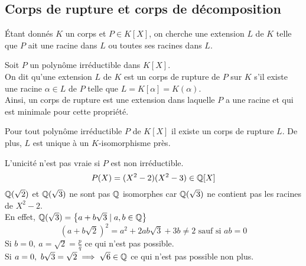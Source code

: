 \subsection{Corps de rupture et corps de décomposition}

Étant donnés $K$ un corps et $P\in K[X]$, on cherche une extension $L$ de $K$ telle que $P$ ait une racine dans $L$ ou toutes ses racines dans $L$.



\begin{definition}
	Soit $P$ un polynôme irréductible dans $K[X]$.\\
	On dit qu'une extension $L$ de $K$ est un corps de rupture de $P$ sur $K$ s'il existe une
	racine $\alpha \in L$ de $P$ telle que $L = K[\alpha] = K(\alpha)$. \\
	Ainsi, un corps de rupture est une extension dans laquelle $P$ a une racine et
	qui est minimale pour cette propriété.
\end{definition}

\begin{theorem}
	Pour tout polynôme irréductible $P$ de $K[X]$ il existe un corps de rupture $L$.
	De plus, $L$ est unique à un $K$-isomorphisme près.
\end{theorem}


\begin{remarque}
	L'unicité n'est pas vraie si $P$ est non irréductible.
	$$ P(X) = (X^2 - 2) (X^2 - 3) \in \mathbb{Q}[X]$$
	$\mathbb{Q}(\sqrt{2})$ et $\mathbb{Q}(\sqrt{3})$ ne sont pas $\mathbb{Q}$ isomorphes car
	$\mathbb{Q}(\sqrt{3})$ ne contient pas les racines de $X^2-2$.\\
	En effet, $\mathbb{Q}(\sqrt{3}) = \left\{  a + b\sqrt{3} \mid a,b \in \mathbb{Q}  \right\}$
	$$ (a + b\sqrt{2}) ^2 = a^2 + 2ab\sqrt{3}  + 3b \neq 2 \text{ sauf si } ab = 0$$
	Si $b=0, \ a = \sqrt{2} = \frac{p}{q}$ ce qui n'est pas possible. \\
	Si $a=0, \ b\sqrt{3} = \sqrt{2} \implies \sqrt{6} \in \mathbb{Q} $ ce qui n'est pas possible non plus.
\end{remarque}

